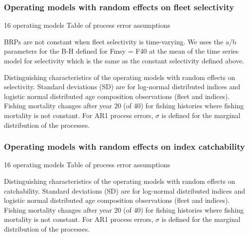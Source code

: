 \documentclass[
  12pt,
]{article}
\begin{document}
\hypertarget{operating-models-with-random-effects-on-fleet-selectivity}{%
\subsubsection{Operating models with random effects on fleet
selectivity}\label{operating-models-with-random-effects-on-fleet-selectivity}}

16 operating models Table of process error assumptions

BRPs are not constant when fleet selectivity is time-varying. We uses
the a/b parameters for the B-H defined for Fmsy = F40 at the mean of the
time series model for selectivity which is the same as the constant
selectivity defined above.

\begin{landscape}
\begin{table}
\caption{Distinguishing characteristics of the operating models with random effects on selectivity. Standard deviations (SD) are for log-normal distributed indices and logistic normal distributed age composition observations (fleet and indices). Fishing mortality changes after year 20 (of 40) for fishing histories where fishing mortality is not constant. For AR1 process errors, $\sigma$ is defined for the marginal distribution of the processes.}
{}
\end{table}
\end{landscape}

\hypertarget{operating-models-with-random-effects-on-index-catchability}{%
\subsubsection{Operating models with random effects on index
catchability}\label{operating-models-with-random-effects-on-index-catchability}}

16 operating models Table of process error assumptions

\begin{landscape}
\begin{table}
\caption{Distinguishing characteristics of the operating models with random effects on catchability. Standard deviations (SD) are for log-normal distributed indices and logistic normal distributed age composition observations (fleet and indices). Fishing mortality changes after year 20 (of 40) for fishing histories where fishing mortality is not constant. For AR1 process errors, $\sigma$ is defined for the marginal distribution of the processes.}
{}
\end{table}
\end{landscape}
\end{document}
